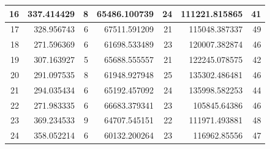 \begin{table}
\begin{adjustwidth}{}{}
{{\begin{tabular}{|r|r|r|r|r|r|r|}
	\hline
	16                                         & 337.414429                   & 8                                     & 65486.100739                   & 24                                    & 111221.815865                & 41                                     \\ 
	\hline
	17                                         & 328.956743                   & 6                                     & 67511.591209                   & 21                                    & 115048.387337                & 49                                     \\ 
	\hline
	18                                         & 271.596369                   & 6                                     & 61698.533489                   & 23                                    & 120007.382874                & 46                                     \\ 
	\hline
	19                                         & 307.163927                   & 5                                     & 65688.555557                   & 21                                    & 122245.078575                & 42                                     \\ 
	\hline
	20                                         & 291.097535                   & 8                                     & 61948.927948                   & 25                                    & 135302.486481                & 46                                     \\ 
	\hline
	21                                         & 294.035434                   & 6                                     & 65192.457092                   & 24                                    & 135998.582253                & 44                                     \\ 
	\hline
	22                                         & 271.983335                   & 6                                     & 66683.379341                   & 23                                    & 105845.64386                 & 46                                     \\ 
	\hline
	23                                         & 369.234533                   & 9                                     & 64707.545151                   & 22                                    & 111971.493881                & 48                                     \\ 
	\hline
	24                                         & 358.052214                   & 6                                     & 60132.200264                   & 23                                    & 116962.85556                 & 47                                     \\ 

\end{tabular}}}
\end{adjustwidth}
\end{table}
